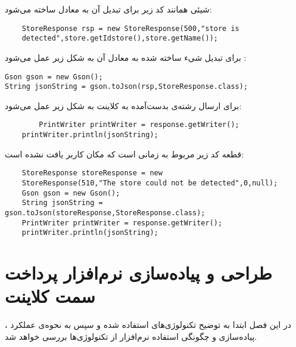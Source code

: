 \documentclass[oneside]{report}
\begin{document}
شیئی همانند کد زیر برای تبدیل آن به معادل 
{\normalsize{}}
ساخته می‌شود:
\begin{latin}
	\begin{verbatim}
	StoreResponse rsp = new StoreResponse(500,"store is 
	detected",store.getIdstore(),store.getName());
	\end{verbatim}
	
\end{latin}
	برای تبدیل شیء ساخته شده به معادل 
	{\normalsize{}}
	آن به شکل زیر عمل می‌شود : 
	\begin{latin}
		\begin{verbatim}
Gson gson = new Gson();
String jsonString = gson.toJson(rsp,StoreResponse.class);
		\end{verbatim}
		
	\end{latin}
برای ارسال رشته‌ی 
			{\normalsize{}}
			بدست‌آمده به کلاینت به شکل زیر عمل می‌شود: 
\begin{latin}
	\begin{verbatim}
		PrintWriter printWriter = response.getWriter();
	printWriter.println(jsonString);
	\end{verbatim}
	
\end{latin}			
		
		قطعه کد زیر مربوط به زمانی است که مکان کاربر یافت نشده است:‌
	\begin{latin}
		\begin{verbatim}
	StoreResponse storeResponse = new 
	StoreResponse(510,"The store could not be detected",0,null);
	Gson gson = new Gson();
	String jsonString = gson.toJson(storeResponse,StoreResponse.class);
	PrintWriter printWriter = response.getWriter();
	printWriter.println(jsonString);
		\end{verbatim}
		
	\end{latin}		
	
	\section{{\large{}}}
	
	
	
		
		\chapter{طراحی و پیاده‌سازی نرم‌افزار پرداخت سمت کلاینت}\label{clientimplementation}
در این فصل ابتدا به توضیح تکنولوژی‌های استفاده شده و سپس به نحوه‌ی عملکرد ، پیاده‌سازی و چگونگی استفاده نرم‌افزار از تکنولوژی‌ها بررسی خواهد شد.
\end{document}
